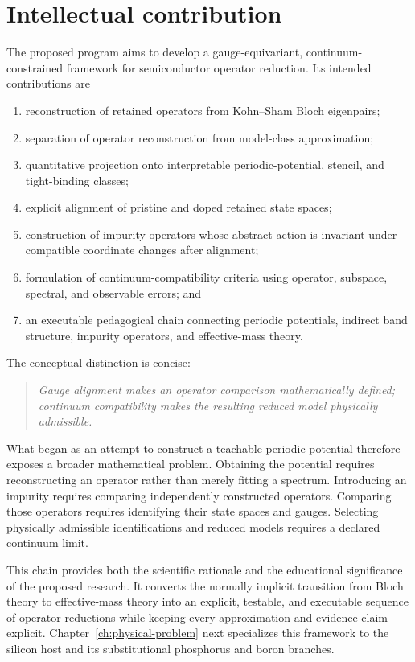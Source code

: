 \section{Intellectual contribution}

The proposed program aims to develop a gauge-equivariant,
continuum-constrained framework for semiconductor operator reduction. Its
intended contributions are
\begin{enumerate}
    \item reconstruction of retained operators from Kohn--Sham Bloch
          eigenpairs;
    \item separation of operator reconstruction from model-class
          approximation;
    \item quantitative projection onto interpretable periodic-potential,
          stencil, and tight-binding classes;
    \item explicit alignment of pristine and doped retained state spaces;
    \item construction of impurity operators whose abstract action is invariant
          under compatible coordinate changes after alignment;
    \item formulation of continuum-compatibility criteria using operator,
          subspace, spectral, and observable errors; and
    \item an executable pedagogical chain connecting periodic potentials,
          indirect band structure, impurity operators, and effective-mass
          theory.
\end{enumerate}

The conceptual distinction is concise:
\begin{quote}
\itshape
Gauge alignment makes an operator comparison mathematically defined;
continuum compatibility makes the resulting reduced model physically
admissible.
\end{quote}

What began as an attempt to construct a teachable periodic potential therefore
exposes a broader mathematical problem. Obtaining the potential requires
reconstructing an operator rather than merely fitting a spectrum. Introducing
an impurity requires comparing independently constructed operators. Comparing
those operators requires identifying their state spaces and gauges. Selecting
physically admissible identifications and reduced models requires a declared
continuum limit.

This chain provides both the scientific rationale and the educational
significance of the proposed research. It converts the normally implicit
transition from Bloch theory to effective-mass theory into an explicit,
testable, and executable sequence of operator reductions while keeping every
approximation and evidence claim explicit. Chapter~\ref{ch:physical-problem}
next specializes this framework to the silicon host and its substitutional
phosphorus and boron branches.
